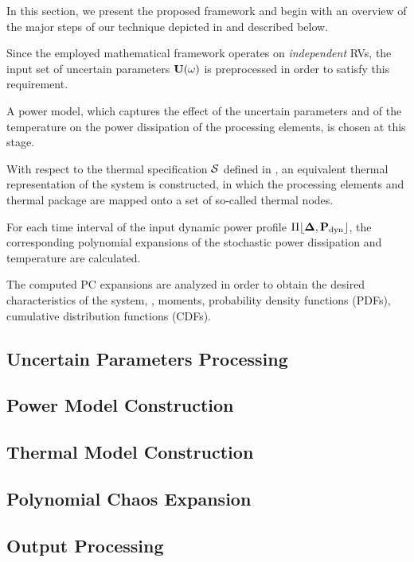 In this section, we present the proposed framework and begin with an overview of the major steps of our technique depicted in  and described below.

 Since the employed mathematical framework operates on \emph{independent} RVs, the input set of uncertain parameters $\mathbf{U}(\omega)$ is preprocessed in order to satisfy this requirement.

 A power model, which captures the effect of the uncertain parameters and of the temperature on the power dissipation of the processing elements, is chosen at this stage.

 With respect to the thermal specification $\mathcal{S}$ defined in , an equivalent thermal representation of the system is constructed, in which the processing elements and thermal package are mapped onto a set of so-called thermal nodes.

 For each time interval of the input dynamic power profile $\profPdyn$, the corresponding polynomial expansions of the stochastic power dissipation and temperature are calculated.

 The computed PC expansions are analyzed in order to obtain the desired characteristics of the system, \eg, moments, probability density functions (PDFs), cumulative distribution functions (CDFs).

\subsection{Uncertain Parameters Processing} 


\subsection{Power Model Construction} 


\subsection{Thermal Model Construction} 


\subsection{Polynomial Chaos Expansion} 


\subsection{Output Processing} 

